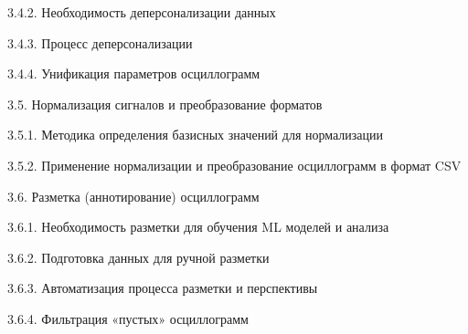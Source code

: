 \noindent\hspace*{3.0em}3.4.2. Необходимость деперсонализации данных\par\vspace{0.5mm}
\noindent\hspace*{3.0em}3.4.3. Процесс деперсонализации\par\vspace{0.5mm}
\noindent\hspace*{3.0em}3.4.4. Унификация параметров осциллограмм\par\vspace{0.5mm}
\noindent\hspace*{1.5em}3.5. Нормализация сигналов и преобразование форматов\par\vspace{0.5mm}
\noindent\hspace*{3.0em}3.5.1. Методика определения базисных значений для нормализации\par\vspace{0.5mm}
\noindent\hspace*{3.0em}3.5.2. Применение нормализации и преобразование осциллограмм в формат CSV\par\vspace{0.5mm}
\noindent\hspace*{1.5em}3.6. Разметка (аннотирование) осциллограмм\par\vspace{0.5mm}
\noindent\hspace*{3.0em}3.6.1. Необходимость разметки для обучения ML моделей и анализа\par\vspace{0.5mm}
\noindent\hspace*{3.0em}3.6.2. Подготовка данных для ручной разметки\par\vspace{0.5mm}
\noindent\hspace*{3.0em}3.6.3. Автоматизация процесса разметки и перспективы\par\vspace{0.5mm}
\noindent\hspace*{3.0em}3.6.4. Фильтрация «пустых» осциллограмм\par\vspace{0.5mm}
